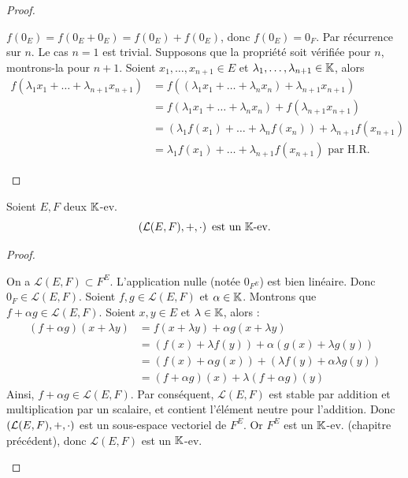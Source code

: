 \documentclass[12pt, a4paper]{report}
\begin{document}
\begin{proof}
    \begin{outline}[enumerate]
        \1 $f(0_E) = f(0_E + 0_E) = f(0_E) + f(0_E)$, donc $f(0_E) = 0_F$.
        \1 Par récurrence sur $n$. Le cas $n=1$ est trivial. Supposons que la propriété soit vérifiée pour $n$, montrons-la pour $n+1$. Soient $x_1,\dots,x_{n+1}\in E$ et $\lambda_1,\dots,\lambda_{n+1}\in\mathbb{K}$, alors
        \begin{align*}
            f(\lambda_1 x_1 + \dots + \lambda_{n+1} x_{n+1}) &= f((\lambda_1 x_1 + \dots + \lambda_n x_n) + \lambda_{n+1} x_{n+1})\\
            &= f(\lambda_1 x_1 + \dots + \lambda_n x_n) + f(\lambda_{n+1} x_{n+1})\\
            &= (\lambda_1 f(x_1) + \dots + \lambda_n f(x_n)) + \lambda_{n+1} f(x_{n+1})\\
            &= \lambda_1 f(x_1) + \dots + \lambda_{n+1} f(x_{n+1}) \text{ par H.R.}
        \end{align*}
    \end{outline}
\end{proof}

\begin{property}
    Soient $E,F$ deux $\mathbb{K}$-ev.
    $$\left(\mathcal L(E,F), +, \cdot\right) \text{ est un } \mathbb{K}\text{-ev.}$$
\end{property}

\begin{proof}
    \begin{outline}
        \1 On a $\mathcal L(E,F) \subset F^E$.
        \1 L'application nulle (notée $0_{F^E}$) est bien linéaire. Donc $0_F \in \mathcal L(E,F)$.
        \1 Soient $f,g \in \mathcal L(E,F)$ et $\alpha \in \mathbb{K}$. Montrons que $f + \alpha g \in \mathcal L(E,F)$. Soient $x,y \in E$ et $\lambda \in \mathbb{K}$, alors :
        \begin{align*}
            (f + \alpha g)(x + \lambda y) &= f(x + \lambda y) + \alpha g(x + \lambda y)\\
            &= (f(x) + \lambda f(y)) + \alpha(g(x) + \lambda g(y))\\
            &= (f(x) + \alpha g(x)) + (\lambda f(y) + \alpha \lambda g(y))\\
            &= (f + \alpha g)(x) + \lambda (f + \alpha g)(y)
        \end{align*}
        \1 Ainsi, $f + \alpha g \in \mathcal L(E,F)$.
        \1 Par conséquent, $\mathcal L(E,F)$ est stable par addition et multiplication par un scalaire, et contient l'élément neutre pour l'addition. Donc $\left(\mathcal L(E,F), +, \cdot\right)$ est un sous-espace vectoriel de $F^E$. Or $F^E$ est un $\mathbb{K}$-ev. (chapitre précédent), donc $\mathcal L(E,F)$ est un $\mathbb{K}$-ev.
    \end{outline}
\end{proof}
\end{document}

